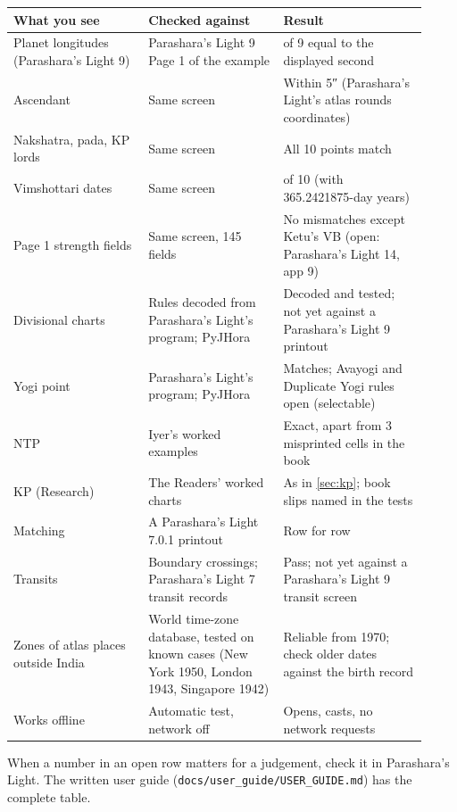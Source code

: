 \documentclass[11pt, a4paper]{article}
\newcommand{\PL}{Parashara's Light}
\newcommand{\ex}[1]{\texttt{#1}}             %
\begin{document}
\begin{longtable}{>{\raggedright\arraybackslash}p{0.30\linewidth} >{\raggedright\arraybackslash}p{0.30\linewidth} >{\raggedright\arraybackslash}p{0.32\linewidth}}
\toprule
What you see & Checked against & Result \\
\midrule
\endhead
Planet longitudes (\PL{} 9) & \PL{} 9 Page 1 of the example & 9 of 9 equal to the displayed second \\
Ascendant & Same screen & Within 5″ (\PL{}'s atlas rounds coordinates) \\
Nakshatra, pada, KP lords & Same screen & All 10 points match \\
Vimshottari dates & Same screen & 10 of 10 (with 365.2421875-day years) \\
Page 1 strength fields & Same screen, 145 fields & No mismatches except Ketu's VB (open: \PL{} 14, app 9) \\
Divisional charts & Rules decoded from \PL{}'s program; PyJHora & Decoded and tested; not yet against a \PL{} 9 printout \\
Yogi point & \PL{}'s program; PyJHora & Matches; Avayogi and Duplicate Yogi rules open (selectable) \\
NTP & Iyer's worked examples & Exact, apart from 3 misprinted cells in the book \\
KP (Research) & The Readers' worked charts & As in \autoref{sec:kp}; book slips named in the tests \\
Matching & A \PL{} 7.0.1 printout & Row for row \\
Transits & Boundary crossings; \PL{} 7 transit records & Pass; not yet against a \PL{} 9 transit screen \\
Zones of atlas places outside India & World time-zone database, tested on known cases (New York 1950, London 1943, Singapore 1942) & Reliable from 1970; check older dates against the birth record \\
Works offline & Automatic test, network off & Opens, casts, no network requests \\
\bottomrule
\end{longtable}

When a number in an open row matters for a judgement, check it in \PL{}. The written user guide
(\ex{docs/user\_guide/USER\_GUIDE.md}) has the complete table.

\end{document}
